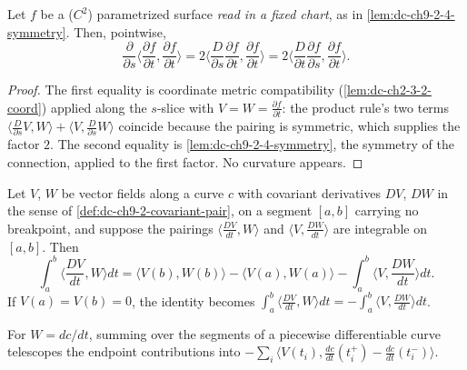 \begin{lemma}
  \label{lem:dc-ch9-2-4-energy-density}
  \leanok
  Let $f$ be a ($C^2$) parametrized surface \emph{read in a fixed chart}, as in
  \cref{lem:dc-ch9-2-4-symmetry}. Then, pointwise,
  $$
  \frac{\partial}{\partial s}\Big\langle\frac{\partial f}{\partial t},\frac{\partial f}{\partial t}\Big\rangle
    = 2\Big\langle\frac{D}{\partial s}\frac{\partial f}{\partial t},\frac{\partial f}{\partial t}\Big\rangle
    = 2\Big\langle\frac{D}{\partial t}\frac{\partial f}{\partial s},\frac{\partial f}{\partial t}\Big\rangle.
  $$
\end{lemma}
\begin{proof}
  \leanok
  \sketch
  The first equality is coordinate metric compatibility (\cref{lem:dc-ch2-3-2-coord})
  applied along the $s$-slice with $V=W=\frac{\partial f}{\partial t}$: the product rule's
  two terms $\langle\frac{D}{\partial s}V,W\rangle+\langle V,\frac{D}{\partial s}W\rangle$
  coincide because the pairing is symmetric, which supplies the factor $2$. The second
  equality is \cref{lem:dc-ch9-2-4-symmetry}, the symmetry of the connection, applied to
  the first factor. No curvature appears.
\end{proof}
\begin{lemma}
  \label{lem:dc-ch9-2-4-parts}
  \leanok
  Let $V$, $W$ be vector fields along a curve $c$ with covariant derivatives $DV$, $DW$
  in the sense of \cref{def:dc-ch9-2-covariant-pair}, on a segment $[a,b]$ carrying no
  breakpoint, and suppose the pairings $\langle\frac{DV}{dt},W\rangle$ and
  $\langle V,\frac{DW}{dt}\rangle$ are integrable on $[a,b]$. Then
  $$
  \int_a^b\Big\langle\frac{DV}{dt},W\Big\rangle dt
    = \langle V(b),W(b)\rangle-\langle V(a),W(a)\rangle
      -\int_a^b\Big\langle V,\frac{DW}{dt}\Big\rangle dt.
  $$
  If $V(a)=V(b)=0$, the identity becomes
  $\int_a^b\langle\frac{DV}{dt},W\rangle dt=-\int_a^b\langle V,\frac{DW}{dt}\rangle dt$.

  For $W=dc/dt$, summing over the segments of a piecewise differentiable curve
  telescopes the endpoint contributions into
  $-\sum_i\langle V(t_i),\frac{dc}{dt}(t_i^+)-\frac{dc}{dt}(t_i^-)\rangle$.
\end{lemma}
